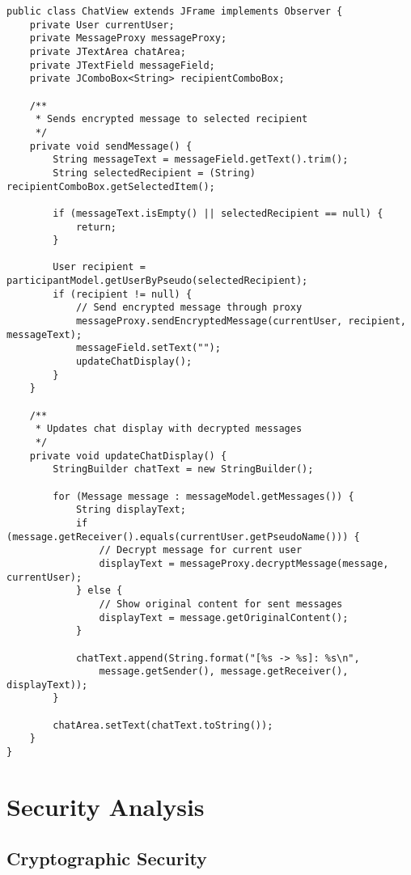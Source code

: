 \documentclass[12pt,a4paper]{article}
\begin{document}
\begin{lstlisting}[caption=Secure Chat Implementation]
public class ChatView extends JFrame implements Observer {
    private User currentUser;
    private MessageProxy messageProxy;
    private JTextArea chatArea;
    private JTextField messageField;
    private JComboBox<String> recipientComboBox;

    /**
     * Sends encrypted message to selected recipient
     */
    private void sendMessage() {
        String messageText = messageField.getText().trim();
        String selectedRecipient = (String) recipientComboBox.getSelectedItem();

        if (messageText.isEmpty() || selectedRecipient == null) {
            return;
        }

        User recipient = participantModel.getUserByPseudo(selectedRecipient);
        if (recipient != null) {
            // Send encrypted message through proxy
            messageProxy.sendEncryptedMessage(currentUser, recipient, messageText);
            messageField.setText("");
            updateChatDisplay();
        }
    }

    /**
     * Updates chat display with decrypted messages
     */
    private void updateChatDisplay() {
        StringBuilder chatText = new StringBuilder();

        for (Message message : messageModel.getMessages()) {
            String displayText;
            if (message.getReceiver().equals(currentUser.getPseudoName())) {
                // Decrypt message for current user
                displayText = messageProxy.decryptMessage(message, currentUser);
            } else {
                // Show original content for sent messages
                displayText = message.getOriginalContent();
            }

            chatText.append(String.format("[%s -> %s]: %s\n",
                message.getSender(), message.getReceiver(), displayText));
        }

        chatArea.setText(chatText.toString());
    }
}
\end{lstlisting}

\section{Security Analysis}

\subsection{Cryptographic Security}
\end{document}

